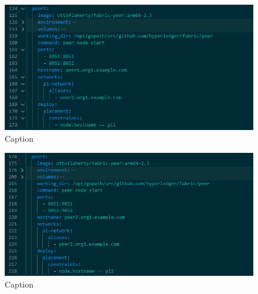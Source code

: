 \begin{figure}
    \centering
    \includegraphics[width=\textwidth]{pinetwork3.PNG}
    \caption{Caption}
    \label{fig:my_label}
\end{figure}
\begin{figure}
    \centering
    \includegraphics[width=\textwidth]{pinetwork4.PNG}
    \caption{Caption}
    \label{fig:my_label}
\end{figure}